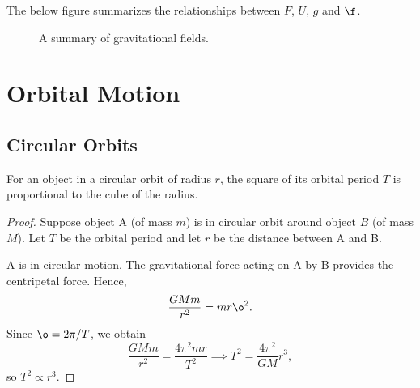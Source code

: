 The below figure summarizes the relationships between $F$, $U$, $g$ and $\f$.

\begin{figure}[H]
    \centering
    \caption{A summary of gravitational fields.}
\end{figure}

\section{Orbital Motion}

\subsection{Circular Orbits}

\begin{law}
    For an object in a circular orbit of radius $r$, the square of its orbital period $T$ is proportional to the cube of the radius.
\end{law}
\begin{proof}
    Suppose object A (of mass $m$) is in circular orbit around object $B$ (of mass $M$). Let $T$ be the orbital period and let $r$ be the distance between A and B.

    A is in circular motion. The gravitational force acting on A by B provides the centripetal force. Hence, \[\frac{GMm}{r^2} = mr\o^2.\] Since $\o = 2\pi/T$, we obtain \[\frac{GMm}{r^2} = \frac{4\pi^2 mr}{T^2} \implies T^2 = \frac{4\pi^2}{GM} r^3,\] so $T^2 \propto r^3$.
\end{proof}

